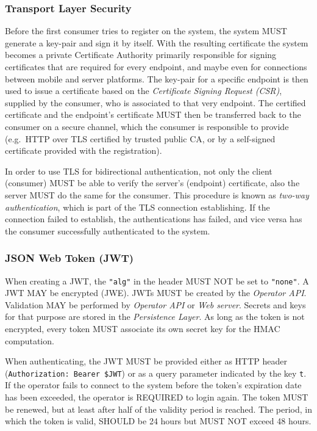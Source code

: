 \documentclass[12pt,english,a4paper,titlepage,cleardoublepage=empty,dottedtoc]{report}
\begin{document}
\subsubsection{Transport Layer Security}\label{transport-layer-security}

Before the first consumer tries to register on the system, the system
MUST generate a key-pair and sign it by itself. With the resulting
certificate the system becomes a private Certificate Authority primarily
responsible for signing certificates that are required for every
endpoint, and maybe even for connections between mobile and server
platforms. The key-pair for a specific endpoint is then used to issue a
certificate based on the \emph{Certificate Signing Request (CSR)},
supplied by the consumer, who is associated to that very endpoint. The
certified certificate and the endpoint's certificate MUST then be
transferred back to the consumer on a secure channel, which the consumer
is responsible to provide (e.g.~HTTP over TLS certified by trusted
public CA, or by a self-signed certificate provided with the
registration).

In order to use TLS for bidirectional authentication, not only the
client (consumer) MUST be able to verify the server's (endpoint)
certificate, also the server MUST do the same for the consumer. This
procedure is known as \emph{two-way authentication}, which is part of
the TLS connection establishing. If the connection failed to establish,
the authentications has failed, and vice versa has the consumer
successfully authenticated to the system.

\subsubsection{JSON Web Token (JWT)}\label{json-web-token-jwt}

When creating a JWT, the \texttt{"alg"} in the header MUST NOT be set to
\texttt{"none"}. A JWT MAY be encrypted (JWE). JWTs MUST be created by
the \emph{Operator API}. Validation MAY be performed by \emph{Operator
API} or \emph{Web server}. Secrets and keys for that purpose are stored
in the \emph{Persistence Layer}. As long as the token is not encrypted,
every token MUST associate its own secret key for the HMAC computation.

When authenticating, the JWT MUST be provided either as HTTP header
(\texttt{Authorization:\ Bearer\ \$JWT}) or as a query parameter
indicated by the key \texttt{t}. If the operator fails to connect to the
system before the token's expiration date has been exceeded, the
operator is REQUIRED to login again. The token MUST be renewed, but at
least after half of the validity period is reached. The period, in which
the token is valid, SHOULD be 24 hours but MUST NOT exceed 48 hours.
\end{document}
